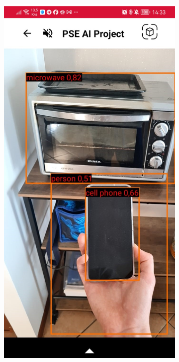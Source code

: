 \begin{figure}[H]
  \centering
  \begin{subfigure}[b]{0.3\textwidth}
    \includegraphics[width=\textwidth, height=0.45\textheight]{Immagini/App/funzionamento_3rettangoli.png}

\end{subfigure}
\end{figure}
